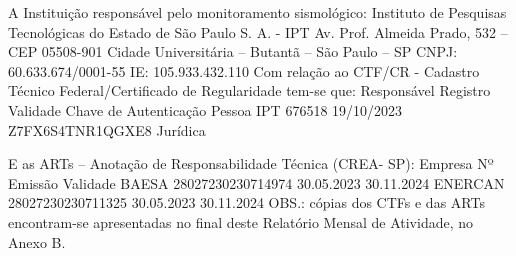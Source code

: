 A Instituição responsável pelo monitoramento sismológico:
Instituto de Pesquisas Tecnológicas do Estado de São Paulo S. A. - IPT
Av. Prof. Almeida Prado, 532 – CEP 05508-901
Cidade Universitária – Butantã – São Paulo – SP
CNPJ: 60.633.674/0001-55
IE: 105.933.432.110
Com relação ao CTF/CR - Cadastro Técnico Federal/Certificado de Regularidade tem-se que:
Responsável
Registro
Validade
Chave de Autenticação
Pessoa
IPT
676518
19/10/2023
Z7FX6S4TNR1QGXE8
Jurídica


E as ARTs – Anotação de Responsabilidade Técnica (CREA- SP):
Empresa
Nº
Emissão
Validade
BAESA
28027230230714974
30.05.2023
30.11.2024
ENERCAN
28027230230711325
30.05.2023
30.11.2024
OBS.: cópias dos CTFs e das ARTs encontram-se apresentadas no final deste Relatório Mensal de Atividade, no Anexo B.


